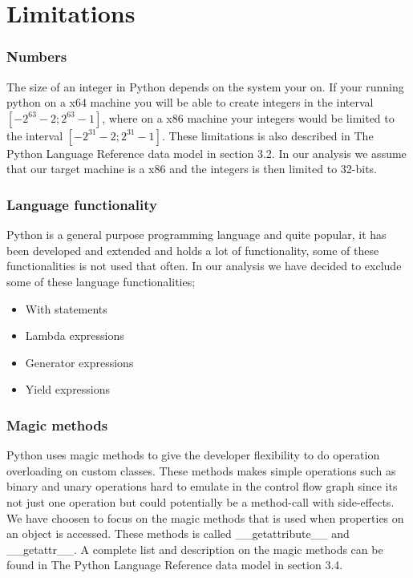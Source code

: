 \chapter{Limitations}

\subsection{Numbers}
The size of an integer in Python depends on the system your on. If your running python on a x64 machine you will be able to create integers in the interval $[-2^{63}-2;2^{63}-1]$, where on a x86 machine your integers would be limited to the interval $[-2^{31}-2;2^{31}-1]$. These limitations is also described in The Python Language Reference data model\cite{pyref.datamodel} in section 3.2. In our analysis we assume that our target machine is a x86 and the integers is then limited to 32-bits.

\subsection{Language functionality}
Python is a general purpose programming language and quite popular, it has been developed and extended and holds a lot of functionality, some of these functionalities is not used that often. In our analysis we have decided to exclude some of these language functionalities;
\begin{itemize}
	\item With statements
	\item Lambda expressions
	\item Generator expressions
	\item Yield expressions
\end{itemize}

\subsection{Magic methods}
Python uses magic methods to give the developer flexibility to do operation overloading on custom classes. These methods makes simple operations such as binary and unary operations hard to emulate in the control flow graph since its not just one operation but could potentially be a method-call with side-effects. \\
We have choosen to focus on the magic methods that is used when properties on an object is accessed. These methods is called \_\_getattribute\_\_ and \_\_getattr\_\_. A complete list and description on the magic methods can be found in The Python Language Reference data model\cite{pyref.datamodel} in section 3.4.
